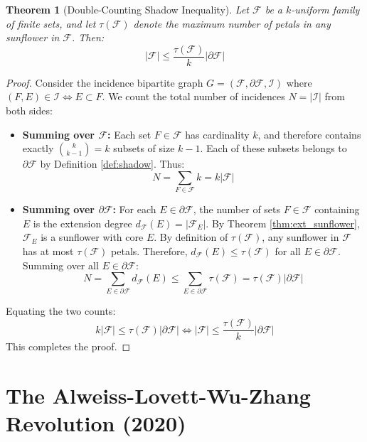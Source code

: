 \documentclass[11pt,a4paper]{article}
\newtheorem{theorem}{Theorem}[section]
\theoremstyle{definition}
\begin{document}
\begin{theorem}[Double-Counting Shadow Inequality]\label{thm:shadow_ineq}
Let $\mathcal{F}$ be a $k$-uniform family of finite sets, and let $\tau(\mathcal{F})$ denote the maximum number of petals in any sunflower in $\mathcal{F}$. Then:
\begin{equation}\label{eq:shadow_bound}
|\mathcal{F}| \le \frac{\tau(\mathcal{F})}{k} |\partial \mathcal{F}|
\end{equation}
\end{theorem}

\begin{proof}
Consider the incidence bipartite graph $G = (\mathcal{F}, \partial \mathcal{F}, \mathcal{I})$ where $(F, E) \in \mathcal{I} \iff E \subset F$.
We count the total number of incidences $N = |\mathcal{I}|$ from both sides:
\begin{itemize}
    \item \textbf{Summing over $\mathcal{F}$:} Each set $F \in \mathcal{F}$ has cardinality $k$, and therefore contains exactly $\binom{k}{k-1} = k$ subsets of size $k-1$. Each of these subsets belongs to $\partial \mathcal{F}$ by Definition \ref{def:shadow}. Thus:
    \[ N = \sum_{F \in \mathcal{F}} k = k |\mathcal{F}| \]
    \item \textbf{Summing over $\partial \mathcal{F}$:} For each $E \in \partial \mathcal{F}$, the number of sets $F \in \mathcal{F}$ containing $E$ is the extension degree $d_\mathcal{F}(E) = |\mathcal{F}_E|$.
    By Theorem \ref{thm:ext_sunflower}, $\mathcal{F}_E$ is a sunflower with core $E$.
    By definition of $\tau(\mathcal{F})$, any sunflower in $\mathcal{F}$ has at most $\tau(\mathcal{F})$ petals.
    Therefore, $d_\mathcal{F}(E) \le \tau(\mathcal{F})$ for all $E \in \partial \mathcal{F}$.
    Summing over all $E \in \partial \mathcal{F}$:
    \[ N = \sum_{E \in \partial \mathcal{F}} d_\mathcal{F}(E) \le \sum_{E \in \partial \mathcal{F}} \tau(\mathcal{F}) = \tau(\mathcal{F}) |\partial \mathcal{F}| \]
\end{itemize}
Equating the two counts:
\[ k |\mathcal{F}| \le \tau(\mathcal{F}) |\partial \mathcal{F}| \iff |\mathcal{F}| \le \frac{\tau(\mathcal{F})}{k} |\partial \mathcal{F}| \]
This completes the proof.
\end{proof}

\section{The Alweiss-Lovett-Wu-Zhang Revolution (2020)}
\end{document}
